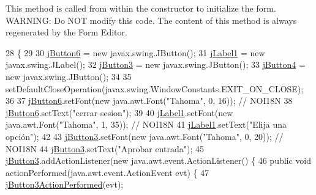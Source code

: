 This method is called from within the constructor to initialize the form. W\+A\+R\+N\+I\+NG\+: Do N\+OT modify this code. The content of this method is always regenerated by the Form Editor. 
\begin{DoxyCode}
28                                   \{
29 
30         \mbox{\hyperlink{classsoftware_1_1_opcionesdirector_ab4528484730d083362682ff5055fb012}{jButton6}} = \textcolor{keyword}{new} javax.swing.JButton();
31         \mbox{\hyperlink{classsoftware_1_1_opcionesdirector_aa19e2adc2e7b50296972e1d6fd9d0b65}{jLabel1}} = \textcolor{keyword}{new} javax.swing.JLabel();
32         \mbox{\hyperlink{classsoftware_1_1_opcionesdirector_a6bf8e6340c64a01cd895c1194d0e2fca}{jButton3}} = \textcolor{keyword}{new} javax.swing.JButton();
33         \mbox{\hyperlink{classsoftware_1_1_opcionesdirector_a2e31e9baad7d82ddcdf5f15d48c07483}{jButton4}} = \textcolor{keyword}{new} javax.swing.JButton();
34 
35         setDefaultCloseOperation(javax.swing.WindowConstants.EXIT\_ON\_CLOSE);
36 
37         \mbox{\hyperlink{classsoftware_1_1_opcionesdirector_ab4528484730d083362682ff5055fb012}{jButton6}}.setFont(\textcolor{keyword}{new} java.awt.Font(\textcolor{stringliteral}{"Tahoma"}, 0, 16)); \textcolor{comment}{// NOI18N}
38         \mbox{\hyperlink{classsoftware_1_1_opcionesdirector_ab4528484730d083362682ff5055fb012}{jButton6}}.setText(\textcolor{stringliteral}{"cerrar sesion"});
39 
40         \mbox{\hyperlink{classsoftware_1_1_opcionesdirector_aa19e2adc2e7b50296972e1d6fd9d0b65}{jLabel1}}.setFont(\textcolor{keyword}{new} java.awt.Font(\textcolor{stringliteral}{"Tahoma"}, 1, 35)); \textcolor{comment}{// NOI18N}
41         \mbox{\hyperlink{classsoftware_1_1_opcionesdirector_aa19e2adc2e7b50296972e1d6fd9d0b65}{jLabel1}}.setText(\textcolor{stringliteral}{"Elija una opción"});
42 
43         \mbox{\hyperlink{classsoftware_1_1_opcionesdirector_a6bf8e6340c64a01cd895c1194d0e2fca}{jButton3}}.setFont(\textcolor{keyword}{new} java.awt.Font(\textcolor{stringliteral}{"Tahoma"}, 0, 20)); \textcolor{comment}{// NOI18N}
44         \mbox{\hyperlink{classsoftware_1_1_opcionesdirector_a6bf8e6340c64a01cd895c1194d0e2fca}{jButton3}}.setText(\textcolor{stringliteral}{"Aprobar entrada"});
45         \mbox{\hyperlink{classsoftware_1_1_opcionesdirector_a6bf8e6340c64a01cd895c1194d0e2fca}{jButton3}}.addActionListener(\textcolor{keyword}{new} java.awt.event.ActionListener() \{
46             \textcolor{keyword}{public} \textcolor{keywordtype}{void} actionPerformed(java.awt.event.ActionEvent evt) \{
47                 \mbox{\hyperlink{classsoftware_1_1_opcionesdirector_a32bd43410331428c339f5c613239cf58}{jButton3ActionPerformed}}(evt);

\end{DoxyCode}
